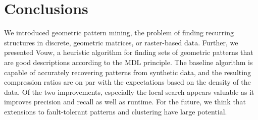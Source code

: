 \documentclass{llncs}
\begin{document}
\section{Conclusions}

We introduced geometric pattern mining, the problem of finding recurring structures in discrete, geometric matrices, or raster-based data. %
Further, we presented Vouw, a heuristic algorithm for finding sets of geometric patterns that are good descriptions according to the MDL principle. The baseline algorithm is capable of accurately recovering patterns from synthetic data, and the resulting compression ratios are on par with the expectations based on the density of the data. Of the two improvements, especially the local search appears valuable as it improves precision and recall as well as runtime. For the future, we think that extensions to fault-tolerant patterns and clustering have large potential.


\end{document}
